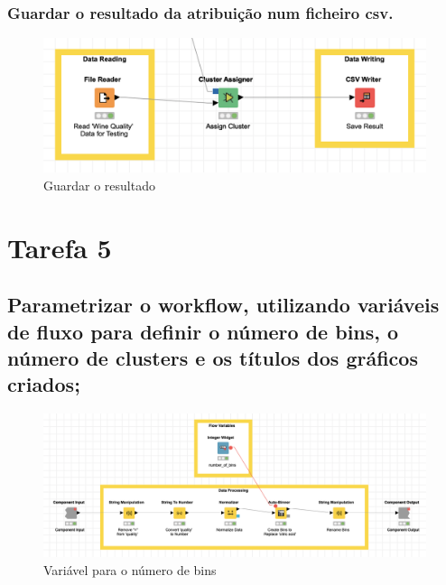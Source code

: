 \documentclass{article}
\begin{document}
\subsubsection{Guardar o resultado da atribuição num ficheiro csv.}

\begin{figure}[H]
    \centering
    \includegraphics[scale=0.4]{Images/T4_d.png}
    \caption{Guardar o resultado}
\end{figure}

\clearpage

\section{Tarefa 5}

\subsection{Parametrizar o workflow, utilizando variáveis de fluxo para definir o número de bins, o número de clusters e os títulos dos gráficos criados;}

\begin{figure}[H]
    \centering
    \includegraphics[scale=0.4]{Images/T5_a.png}
    \caption{Variável para o número de bins}
\end{figure}
\end{document}
